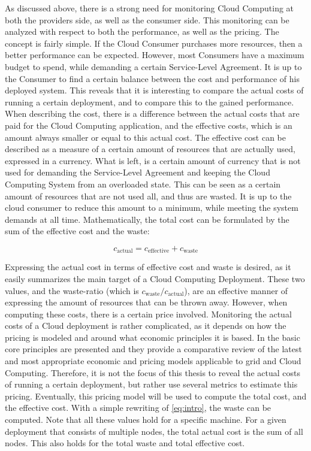 \noindent
As discussed above, there is a strong need for monitoring Cloud Computing at both the providers side, as well as the consumer side. This monitoring can be analyzed with respect to both the performance, as well as the pricing. The concept is fairly simple. If the Cloud Consumer purchases more resources, then a better performance can be expected. However, most Consumers have a maximum budget to spend, while demanding a certain Service-Level Agreement. It is up to the Consumer to find a certain balance between the cost and performance of his deployed system. This reveals that it is interesting to compare the actual costs of running a certain deployment, and to compare this to the gained performance. When describing the cost, there is a difference between the actual costs that are paid for the Cloud Computing application, and the effective costs, which is an amount always smaller or equal to this actual cost. The effective cost can be described as a measure of a certain amount of resources that are actually used, expressed in a currency. What is left, is a certain amount of currency that is not used for demanding the Service-Level Agreement and keeping the Cloud Computing System from an overloaded state. This can be seen as a certain amount of resources that are not used all, and thus are wasted. It is up to the cloud consumer to reduce this amount to a minimum, while meeting the system demands at all time. Mathematically, the total cost can be formulated by the sum of the effective cost and the waste:

\begin{equation}\label{eq:intro}
  c_\text{actual} = c_\text{effective} + c_\text{waste}  
\end{equation}

\noindent
Expressing the actual cost in terms of effective cost and waste is desired, as it easily summarizes the main target of a Cloud Computing Deployment. These two values, and the waste-ratio (which is $c_\text{waste} /c_\text{actual}$), are an effective manner of expressing the amount of resources that can be thrown away. However, when computing these costs, there is a certain price involved. Monitoring the actual costs of a Cloud deployment is rather complicated, as it depends on how the pricing is modeled and around what economic principles it is based. In \cite{samimi2011review} the basic core principles are presented and they provide a comparative review of the latest and most appropriate economic and pricing models applicable to grid and Cloud Computing. Therefore, it is not the focus of this thesis to reveal the actual costs of running a certain deployment, but rather use several metrics to estimate this pricing. Eventually, this pricing model will be used to compute the total cost, and the effective cost. With a simple rewriting of \autoref{eq:intro}, the waste can be computed. Note that all these values hold for a specific machine. For a given deployment that consists of multiple nodes, the total actual cost is the sum of all nodes. This also holds for the total waste and total effective cost.\\

